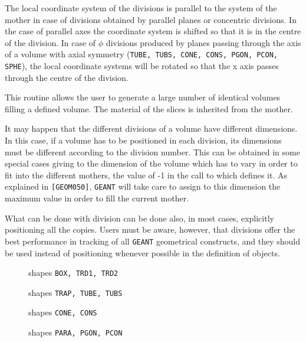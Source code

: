 The local coordinate system of the divisions is parallel to the
system of the mother in case of divisions obtained by parallel planes or
concentric divisions. In the case of parallel axes the coordinate system
is shifted so that it is in the centre of the division.
In case of $\phi$ divisions produced by planes
passing through the axis of a volume with axial symmetry ({\tt TUBE, TUBS,
CONE, CONS, PGON, PCON, SPHE}), the local coordinate systems will be 
rotated so that the x axis passes through the centre of the division.

This routine allows the user to generate a large number of identical
volumes filling a defined volume. The material of the slices is inherited
from the mother.

It may happen that the different divisions of a volume have different
dimensions. In this case, if a volume has to be positioned in each division, 
its dimensions must be different according to the division number. This can
be obtained in some special cases giving to the dimension of the
volume which has to vary in order to fit into the different mothers,
the value of -1 in the call to
 which defines it. As explained in {\tt [GEOM050]}, {\tt GEANT}
will take care to assign to this dimension the maximum value in order to
fill the current mother.

What can be done with division can be done also, in most cases, explicitly
positioning all the copies. Users must be aware, however, that divisions
offer the best performance in tracking of all {\tt GEANT} geometrical
constructs, and they should be used instead of positioning whenever
possible in the definition of objects.

\newpage
\begin{figure}[hbt]
      \centering
      \caption{shapes {\tt BOX, TRD1, TRD2}}
      \label{fg:geom130-1}
\end{figure}
\newpage
\begin{figure}[hbt]
      \centering
      \caption{shapes {\tt TRAP, TUBE, TUBS}}
      \label{fg:geom130-2}
\end{figure}
\newpage
\begin{figure}[hbt]
      \centering
      \caption{shapes {\tt CONE, CONS}}
      \label{fg:geom130-3}
\end{figure}
\newpage
\begin{figure}[hbt]
      \centering
      \caption{shapes {\tt PARA, PGON, PCON}}
      \label{fg:geom130-4}
\end{figure}
